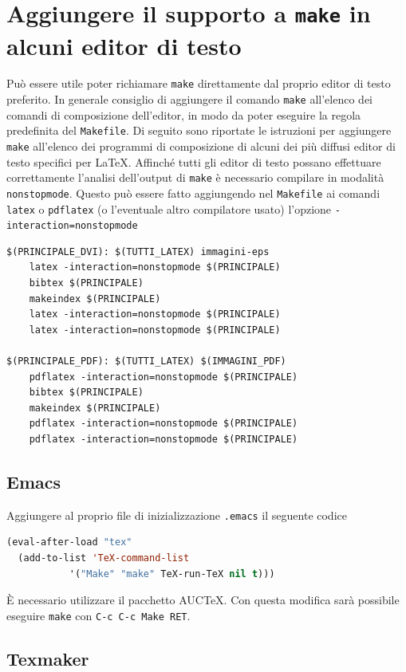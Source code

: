 \section{Aggiungere il supporto a \texttt{make} in alcuni editor di testo}
\label{sec:editor}

Può essere utile poter richiamare \texttt{make} direttamente dal proprio editor
di testo preferito.  In generale consiglio di aggiungere il comando
\texttt{make} all'elenco dei comandi di composizione dell'editor, in modo da
poter eseguire la regola predefinita del \texttt{Makefile}.  Di seguito sono
riportate le istruzioni per aggiungere \texttt{make} all'elenco dei programmi di
composizione di alcuni dei più diffusi editor di testo specifici per \LaTeX{}.
Affinché tutti gli editor di testo possano effettuare correttamente l'analisi
dell'output di \texttt{make} è necessario compilare in modalità
\texttt{nonstopmode}.  Questo può essere fatto aggiungendo nel \texttt{Makefile}
ai comandi \texttt{latex} o \texttt{pdflatex} (o l'eventuale altro compilatore
usato) l'opzione \texttt{-interaction=nonstopmode}
\begin{lstlisting}
$(PRINCIPALE_DVI): $(TUTTI_LATEX) immagini-eps
	latex -interaction=nonstopmode $(PRINCIPALE)
	bibtex $(PRINCIPALE)
	makeindex $(PRINCIPALE)
	latex -interaction=nonstopmode $(PRINCIPALE)
	latex -interaction=nonstopmode $(PRINCIPALE)

$(PRINCIPALE_PDF): $(TUTTI_LATEX) $(IMMAGINI_PDF)
	pdflatex -interaction=nonstopmode $(PRINCIPALE)
	bibtex $(PRINCIPALE)
	makeindex $(PRINCIPALE)
	pdflatex -interaction=nonstopmode $(PRINCIPALE)
	pdflatex -interaction=nonstopmode $(PRINCIPALE)
\end{lstlisting}

\subsection{Emacs}
\label{sec:emacs}

Aggiungere al proprio file di inizializzazione \texttt{.emacs} il seguente codice
\begin{lstlisting}[language=lisp,morekeywords={eval-after-load}]
(eval-after-load "tex"
  (add-to-list 'TeX-command-list
	       '("Make" "make" TeX-run-TeX nil t)))
\end{lstlisting}
È necessario utilizzare il pacchetto AUC\TeX{}.
Con questa modifica sarà possibile eseguire \texttt{make} con
\texttt{C-c C-c Make RET}.

\subsection{Texmaker}
\label{sec:texmaker}

